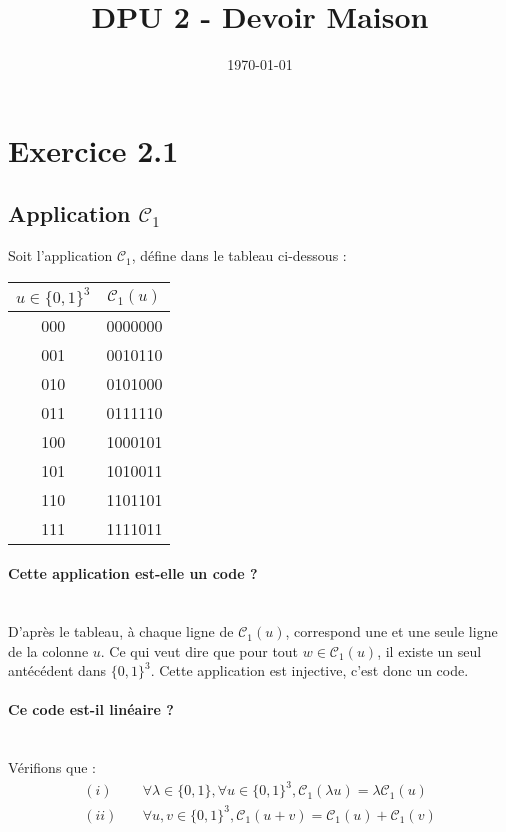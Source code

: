 \documentclass[a4paper,11pt]{article}
\author{}
\title{DPU 2 - Devoir Maison}
\date{\today}
\begin{document}
\maketitle

\section*{Exercice 2.1}
\subsection*{Application $\mathcal{C}_1$}

Soit l'application $\mathcal{C}_1$, défine dans le tableau ci-dessous : \\

\begin{tabular}{|c|c|}
    \hline
    $u\in\{0,1\}^3$ & $\mathcal{C}_1(u)$ \\
    \hline
    000 & 0000000 \\
    001 & 0010110 \\
    010 & 0101000 \\  
    011 & 0111110 \\
    100 & 1000101 \\
    101 & 1010011 \\
    110 & 1101101 \\
    111 & 1111011 \\
    \hline
\end{tabular}

\paragraph{Cette application est-elle un code ?}~\\

D'après le tableau, à chaque ligne de $\mathcal{C}_1(u)$, correspond une et une seule ligne de la colonne $u$. Ce qui veut dire que pour tout $w \in \mathcal{C}_1(u)$, il existe un seul antécédent dans $\{0,1\}^3$. Cette application est injective, c'est donc un code.

\paragraph{Ce code est-il linéaire ?}~\\

Vérifions que :
\[
    \begin{split}
        (i) \quad & \forall \lambda \in \{0,1\}, \forall u \in\{0,1\}^3, \mathcal{C}_1(\lambda u)=\lambda \mathcal{C}_1(u) \\
        (ii) \quad & \forall u,v \in \{0,1\}^3, \mathcal{C}_1(u+v)=\mathcal{C}_1(u)+\mathcal{C}_1(v) \\
    \end{split}
\]
\end{document}
